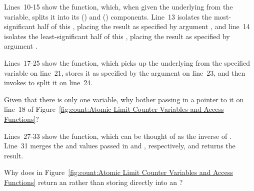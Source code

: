 Lines~10-15 show the  function, which,
when given the underlying  from the  variable, splits it into its  ()
and  () components.
Line~13 isolates the most-significant half of this ,
placing the result as specified by argument ,
and line~14 isolates the least-significant half of this ,
placing the result as specified by argument .

Lines~17-25 show the  function, which
picks up the underlying  from the specified variable
on line~21, stores it as specified by the  argument on
line~23, and then invokes  to split
it on line~24.

\QuickQuiz{}
	Given that there is only one  variable,
	why bother passing in a pointer to it on line~18 of
	Figure~\ref{fig:count:Atomic Limit Counter Variables and Access Functions}?
 \QuickQuizEnd

Lines~27-33 show the  function, which
can be thought of as the inverse of .
Line~31 merges the  and 
values passed in  and , respectively, and returns
the result.

\QuickQuiz{}
	Why does  in
	Figure~\ref{fig:count:Atomic Limit Counter Variables and Access Functions}
	return an  rather than storing directly into an
	?
 \QuickQuizEnd

